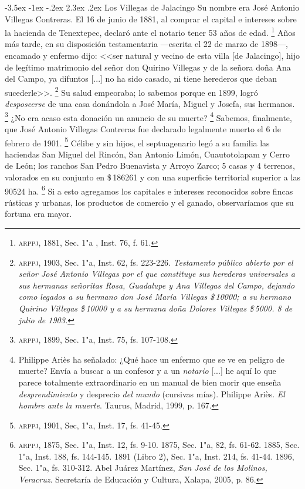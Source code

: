 \documentclass[14pt,twoside,final]{extbook} %
\makeatletter
\let\oldfootnote\footnote
\renewcommand\footnote[1]{%
\oldfootnote{\hspace{1mm}#1}}
\renewcommand\section{\@startsection {section}{1}{\z@}%
                                     {-3.5ex \@plus -1ex \@minus -.2ex}%
                                     {2.3ex \@plus .2ex}%
                                     {\normalfont\large\bfseries\sc}}
\makeatother
\begin{document}
\section{Los Villegas de Jalacingo}\label{sec:Villegas-Jalacingo}
Su nombre era José Antonio Villegas Contreras. El 16 de junio de 1881, al comprar el capital e intereses sobre la hacienda de Tenextepec, declaró ante el notario tener 53 años de edad.\footnote{\textsc{arppj}, 1881, Sec. 1"a , Inst. 76, f. 61.} Años más tarde, en su disposición testamentaria ---escrita el 22 de marzo de 1898---, encamado y enfermo dijo: <<ser natural y vecino de esta villa [de Jalacingo], hijo de legítimo matrimonio del señor don Quirino Villegas y de la señora doña Ana del Campo, ya difuntos [...] no ha sido casado, ni tiene herederos que deban sucederle>>.\footnote{\textsc{arppj}, 1903, Sec. 1"a, Inst. 62, fs. 223-226. \emph{Testamento público abierto por el señor José Antonio Villegas por el que constituye sus herederas universales a sus hermanas señoritas Rosa, Guadalupe y Ana Villegas del Campo, dejando como legados a su hermano don José María Villegas \$\,10000; a su hermano Quirino Villegas \$\,10000 y a su hermana doña Dolores Villegas \$\,5000. 8 de julio de 1903.}} Su salud empeoraba; lo sabemos porque en 1899, logró \emph{desposeerse} de una casa donándola a José María, Miguel y Josefa, sus hermanos.\footnote{\textsc{arppj}, 1899, Sec. 1"a, Inst. 75, fs. 107-108.} ¿No era acaso esta donación un anuncio de su muerte?\footnote{Philippe Ariès ha señalado: ¿Qué hace un enfermo que se ve en peligro de muerte? Envía a buscar a un confesor y a un \emph{notario} [...] he aquí lo que parece totalmente extraordinario en un manual de bien morir que enseña \emph{desprendimiento} y desprecio \emph{del mundo} (cursivas mías). Philippe Ariès. \emph{El hombre ante la muerte}. Taurus, Madrid, 1999, p. 167.} Sabemos, finalmente, que José Antonio Villegas Contreras fue declarado legalmente muerto el 6 de febrero de 1901.\footnote{\textsc{arppj}, 1901, Sec, 1"a, Inst. 17, fs. 41-45.} Célibe y sin hijos, el septuagenario legó a su familia las haciendas San Miguel del Rincón, San Antonio Limón, Cuautotolapam y Cerro de León; los ranchos San Pedro Buenavista y Arroyo Zarco; 5 casas y 4 terrenos, valorados en su conjunto en \$\,186261 y con una superficie territorial superior a las 90524 ha.\footnote{\textsc{arppj}, 1875, Sec. 1"a, Inst. 12, fs. 9-10. 1875, Sec. 1"a, 82, fs. 61-62. 1885, Sec. 1"a, Inst. 188, fs. 144-145. 1891 (Libro 2), Sec. 1"a, Inst. 214, fs. 41-44. 1896, Sec. 1"a, fs. 310-312. Abel Juárez Martínez, \emph{San José de los Molinos, Veracruz}. Secretaría de Educación y Cultura, Xalapa, 2005, p. 86.} Si a esto agregamos los capitales e intereses reconocidos sobre fincas rústicas y urbanas, los productos de comercio y el ganado, observaríamos que su fortuna era mayor.
\end{document}
